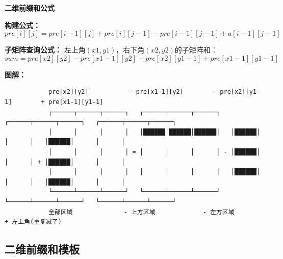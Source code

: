 \documentclass[12pt,a4paper]{article}
\begin{document}
	\begin{bluebox}
		\textbf{二维前缀和公式}
		
		\textbf{构建公式：}
		$$pre[i][j] = pre[i-1][j] + pre[i][j-1] - pre[i-1][j-1] + a[i-1][j-1]$$
		
		\textbf{子矩阵查询公式：}
		左上角$(x1, y1)$，右下角$(x2, y2)$的子矩阵和：
		$$sum = pre[x2][y2] - pre[x1-1][y2] - pre[x2][y1-1] + pre[x1-1][y1-1]$$
		
		\textbf{图解：}
		\begin{verbatim}
			pre[x2][y2]           - pre[x1-1][y2]        - pre[x2][y1-1]        + pre[x1-1][y1-1]
			┌──────┬──────┬──────┐   ┌──────┬──────┬──────┐   ┌──────┬──────┬──────┐   ┌──────┬──────┬──────┐
			│      │      │      │   │██████│██████│██████│   │██████│      │      │   │██████│      │      │
			│      │      │      │ = │      │      │      │ - │██████│      │      │ + │██████│      │      │
			│      │      │      │   │      │      │      │   │██████│      │      │   │██████│      │      │
			└──────┴──────┴──────┘   └──────┴──────┴──────┘   └──────┴──────┴──────┘   └──────┴──────┴──────┘
			全部区域              - 上方区域             - 左方区域              + 左上角(重复减了)
		\end{verbatim}
	\end{bluebox}
	
	\subsection{二维前缀和模板}
	
\end{document}
